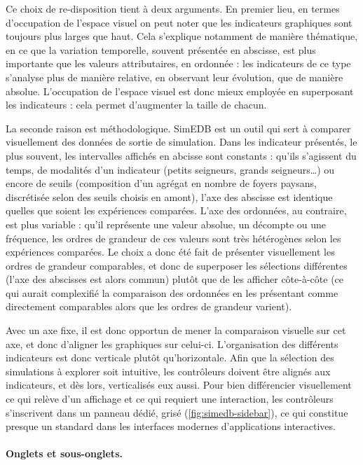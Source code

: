 Ce choix de re-disposition tient à deux arguments.
En premier lieu, en termes d'occupation de l'espace visuel on peut noter que les indicateurs graphiques sont toujours plus larges que haut.
Cela s'explique notamment de manière thématique, en ce que la variation temporelle, souvent présentée en abscisse, est plus importante que les valeurs attributaires, en ordonnée : les indicateurs de ce type s'analyse plus de manière relative, en observant leur évolution, que de manière absolue.
L'occupation de l'espace visuel est donc mieux employée en superposant les indicateurs : cela permet d'augmenter la taille de chacun.

La seconde raison est méthodologique.
SimEDB est un outil qui sert à comparer visuellement des données de sortie de simulation.
Dans les indicateur présentés, le plus souvent, les intervalles affichés en abcisse sont constants : qu'ils s'agissent du temps, de modalités d'un indicateur (petits seigneurs, grands seigneurs\ldots) ou encore de seuils (composition d'un agrégat en nombre de foyers paysans, discrétisée selon des seuils choisis en amont), l'axe des abscisse est identique quelles que soient les expériences comparées.
L'axe des ordonnées, au contraire, est plus variable : qu'il représente une valeur absolue, un décompte ou une fréquence, les ordres de grandeur de ces valeurs sont très hétérogènes selon les expériences comparées.
Le choix a donc été fait de présenter visuellement les ordres de grandeur comparables, et donc de superposer les sélections différentes (l'axe des abscisses est alors commun) plutôt que de les afficher côte-à-côte (ce qui aurait complexifié la comparaison des ordonnées en les présentant comme directement comparables alors que les ordres de grandeur varient).


Avec un axe \og fixe\fg{}, il est donc opportun de mener la comparaison visuelle sur cet axe, et donc d'aligner les graphiques sur celui-ci. L'organisation des différents indicateurs est donc verticale plutôt qu'horizontale.
Afin que la sélection des simulations à explorer soit intuitive, les contrôleurs doivent être alignés aux indicateurs, et dès lors, verticalisés eux aussi.
Pour bien différencier visuellement ce qui relève d'un affichage et ce qui requiert une interaction, les contrôleurs s'inscrivent dans un panneau dédié, grisé (\cref{fig:simedb-sidebar}), ce qui constitue presque un standard dans les interfaces modernes d'applications interactives.

\paragraph{Onglets et sous-onglets.}


